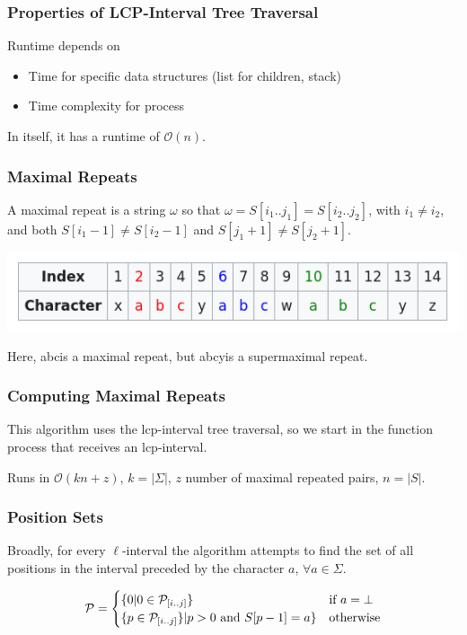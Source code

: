 \documentclass[compress,handout]{beamer} %
\renewcommand{\O}{\mathcal{O}}
\begin{document}
\begin{frame}
	\frametitle{Properties of LCP-Interval Tree Traversal}
	Runtime depends on
	\begin{itemize}
		\item Time for specific data structures (list for children, stack)
		\item Time complexity for process
	\end{itemize}

	In itself, it has a runtime of $\O(n)$.
\end{frame}

\begin{frame}
	\frametitle{Maximal Repeats}
	A maximal repeat is a string $\omega$ so that
	$\omega=S[i_1..j_1]=S[i_2..j_2]$, with $i_1 \ne i_2$, and both
	$S[i_1-1] \ne S[i_2-1]$ and $S[j_1+1] \ne S[j_2+1]$.

	\includegraphics[width=\textwidth, height=\textheight, keepaspectratio=true]{maximal_pair}

	Here, \dq abc\dq is a maximal repeat, but \dq abcy\dq is a supermaximal
	repeat.
\end{frame}

\begin{frame}
	\frametitle{Computing Maximal Repeats}
	This algorithm uses the lcp-interval tree traversal, so we start
	in the function process that receives an lcp-interval.

	Runs in $\O(kn+z)$, $k=|\Sigma|$, $z$ number of maximal repeated
	pairs, $n=|S|$.
\end{frame}

\begin{frame}
	\frametitle{Position Sets}
	Broadly, for every $\ell$-interval the algorithm attempts to
	find the set of all positions in the interval preceded by the
	character $a$, $\forall a \in \Sigma$.

	\begin{equation}
	\mathcal{P}=
	\begin{cases}
		\{ 0 | 0 \in \mathcal{P}_{[i..j]}\} & \text{if $a = \bot$} \\
		\{ p \in \mathcal{P}_{[i..j]}\} | p>0\hbox{ and } S[p-1]=a\} & \text{otherwise}
	\end{cases}
	\end{equation}
\end{frame}
\end{document}
